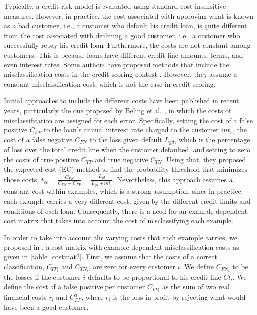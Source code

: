   Typically, a credit risk model is evaluated using standard cost-insensitive measures.
  However, in practice, the cost associated with approving 
  what is known as a bad customer, i.e., a customer who default his credit loan, is quite 
  different from the cost associated with declining a good customer,  i.e., a customer who 
  successfully repay his credit loan. Furthermore, the costs are not constant among customers. 
  This is because loans have different credit line amounts, terms, and even interest rates. Some 
  authors have proposed methods that include the misclassification costs in the credit scoring 
  context \citep{Verbraken2014,Alejo2013,Beling2005,Oliver2009}. However, they assume a constant 
  misclassification cost, which is not the case in credit scoring.
  
 
  Initial approaches to include the different costs have been published in recent years, 
  particularly the one proposed by Beling et al. \citep{Beling2005,Oliver2009}, in which the costs 
  of misclassification are assigned for each error. Specifically, setting the cost of a false 
  positive $C_{FP}$ to the loan's annual interest rate charged to the customer $int_r$, the cost of 
  a false negative $C_{FN}$ to the loss given default $L_{gd}$, which is the percentage of loss 
  over the total credit line when the customer defaulted, and setting to zero the costs of true 
  positive $C_{TP}$ and true negative $C_{TN}$. Using that, they proposed the expected cost (EC) 
  method to find the probability threshold that minimizes those costs, $t_{ec}= 
  \frac{C_{FN}}{C_{FN}+C_{FP}} =\frac{L_{gd}}{L_{gd}+int_r}.$ Nevertheless, this approach assumes 
  a constant cost within examples, which is a strong assumption, since in practice each example 
  carries a very different cost, given by the different credit limits and conditions of each loan. 
  Consequently, there is a need for an example-dependent cost matrix that takes into account the 
  cost of misclassifying each example.
   
  In order to take into account the varying costs that each example carries, we proposed in 
  \citep{CorreaBahnsen2014b}, a cost matrix with example-dependent misclassification costs as 
  given in \tablename{ \ref{table_costmat2}}. First, we assume that the costs of a correct 
  classification, $C_{TP_i}$ and $C_{TN_i}$, are zero for every customer $i$. We define $C_{FN_i}$ 
  to be the losses if the customer $i$ defaults to be proportional to his credit line $Cl_i$. We 
  define the cost of a false positive per customer $C_{FP_i}$ as the sum of two real financial 
  costs $r_i$ and $C^a_{FP}$, where $r_i$ is the loss in profit by rejecting what would have been a 
  good customer. 
  
